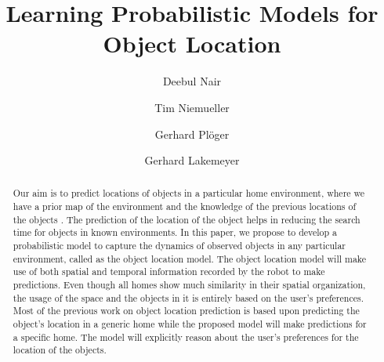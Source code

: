 \documentclass{llncs}
\begin{document}
\title{Learning Probabilistic Models for Object Location }
%
%
\author{Deebul Nair \and Tim Niemueller 
\and Gerhard Pl\"{o}ger  \and Gerhard Lakemeyer }
%
%
%
\maketitle              %

\begin{abstract}
Our aim is to predict locations of objects in a particular home environment, where we
have a prior map of the environment and the knowledge of the previous locations of the
objects . The prediction of the location of the object helps in reducing the search time for
objects in known environments. In this paper, we propose to develop a probabilistic model
to capture the dynamics of observed objects in any particular environment, called as the
object location model. The object location model will make use of both spatial and
temporal information recorded by the robot to make predictions. Even though all homes
show much similarity in their spatial organization, the usage of the space and the objects
in it is entirely based on the user’s preferences. Most of the previous work on object
location prediction is based upon predicting the object’s location in a generic home while
the proposed model will make predictions for a specific home. The model will explicitly
reason about the user’s preferences for the location of the objects.
\end{abstract}
%
\end{document}
